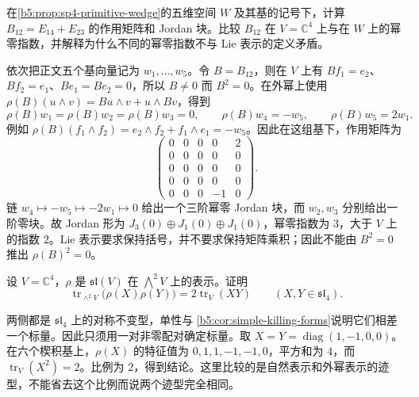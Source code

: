 \begin{exercise}\label{b5:ex:13-primitive-wedge-five}
	在\cref{b5:prop:sp4-primitive-wedge}的五维空间 \(W\) 及其基的记号下，计算 \(B_{12}=E_{14}+E_{23}\) 的作用矩阵和 Jordan 块。比较 \(B_{12}\) 在 \(V=\mathbb C^4\) 上与在 \(W\) 上的幂零指数，并解释为什么不同的幂零指数不与 Lie 表示的定义矛盾。
\end{exercise}
\begin{solution}
	依次把正文五个基向量记为 \(w_1,\ldots,w_5\)。令 \(B=B_{12}\)，则在 \(V\) 上有 \(Bf_1=e_2\)、\(Bf_2=e_1\)、\(Be_1=Be_2=0\)，所以 \(B\ne0\) 而 \(B^2=0\)。在外幂上使用 \(\rho(B)(u\wedge v)=Bu\wedge v+u\wedge Bv\)，得到
	\[
		\rho(B)w_1=\rho(B)w_2=\rho(B)w_3=0,\qquad \rho(B)w_4=-w_5,\qquad \rho(B)w_5=2w_1.
	\]
	例如 \(\rho(B)(f_1\wedge f_2)=e_2\wedge f_2+f_1\wedge e_1=-w_5\)。因此在这组基下，作用矩阵为
	\[
		\begin{pmatrix}
			0&0&0&0&2\\
			0&0&0&0&0\\
			0&0&0&0&0\\
			0&0&0&0&0\\
			0&0&0&-1&0
		\end{pmatrix}.
	\]
	链 \(w_4\mapsto-w_5\mapsto-2w_1\mapsto0\) 给出一个三阶幂零 Jordan 块，而 \(w_2,w_3\) 分别给出一阶零块。故 Jordan 形为 \(J_3(0)\oplus J_1(0)\oplus J_1(0)\)，幂零指数为 \(3\)，大于 \(V\) 上的指数 \(2\)。Lie 表示要求保持括号，并不要求保持矩阵乘积；因此不能由 \(B^2=0\) 推出 \(\rho(B)^2=0\)。
\end{solution}

\begin{exercise}\label{b5:ex:13-exterior-trace-index}
	设 \(V=\mathbb C^4\)，\(\rho\) 是 \(\mathfrak{sl}(V)\) 在 \(\bigwedge^2V\) 上的表示。证明
	\[
		\operatorname{tr}_{\wedge^2V}\bigl(\rho(X)\rho(Y)\bigr) =2\operatorname{tr}_V(XY)\qquad(X,Y\in\mathfrak{sl}_4).
	\]
\end{exercise}
\begin{solution}
	两侧都是 \(\mathfrak{sl}_4\) 上的对称不变型，单性与 \cref{b5:cor:simple-killing-forms}说明它们相差一个标量。因此只须用一对非零配对确定标量。取 \(X=Y=\operatorname{diag}(1,-1,0,0)\)。在六个楔积基上，\(\rho(X)\) 的特征值为 \(0,1,1,-1,-1,0\)，平方和为 \(4\)，而 \(\operatorname{tr}_V(X^2)=2\)。比例为 \(2\)，得到结论。这里比较的是自然表示和外幂表示的迹型，不能省去这个比例而说两个迹型完全相同。
\end{solution}
